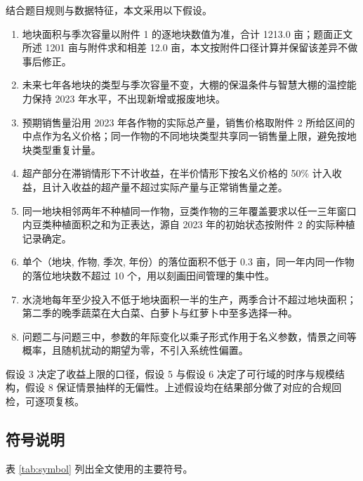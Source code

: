 \documentclass[bwprint]{gmcmthesis}
\begin{document}
结合题目规则与数据特征，本文采用以下假设。

\begin{enumerate}
\item 地块面积与季次容量以附件 1 的逐地块数值为准，合计 1213.0 亩；题面正文所述 1201 亩与附件求和相差 12.0 亩，本文按附件口径计算并保留该差异不做事后修正。
\item 未来七年各地块的类型与季次容量不变，大棚的保温条件与智慧大棚的温控能力保持 2023 年水平，不出现新增或报废地块。
\item 预期销售量沿用 2023 年各作物的实际总产量，销售价格取附件 2 所给区间的中点作为名义价格；同一作物的不同地块类型共享同一销售量上限，避免按地块类型重复计量。
\item 超产部分在滞销情形下不计收益，在半价情形下按名义价格的 50\% 计入收益，且计入收益的超产量不超过实际产量与正常销售量之差。
\item 同一地块相邻两年不种植同一作物，豆类作物的三年覆盖要求以任一三年窗口内豆类种植面积之和为正表达，源自 2023 年的初始状态按附件 2 的实际种植记录确定。
\item 单个（地块, 作物, 季次, 年份）的落位面积不低于 0.3 亩，同一年内同一作物的落位地块数不超过 10 个，用以刻画田间管理的集中性。
\item 水浇地每年至少投入不低于地块面积一半的生产，两季合计不超过地块面积；第二季的晚季蔬菜在大白菜、白萝卜与红萝卜中至多选择一种。
\item 问题二与问题三中，参数的年际变化以乘子形式作用于名义参数，情景之间等概率，且随机扰动的期望为零，不引入系统性偏置。
\end{enumerate}

假设 3 决定了收益上限的口径，假设 5 与假设 6 决定了可行域的时序与规模结构，假设 8 保证情景抽样的无偏性。上述假设均在结果部分做了对应的合规回检，可逐项复核。

\subsection{符号说明}

表 \ref{tab:symbol} 列出全文使用的主要符号。
\end{document}
